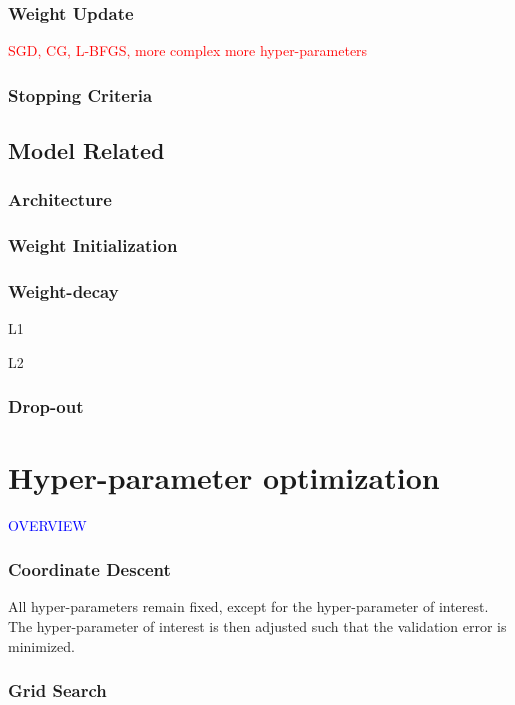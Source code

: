 \subsubsection{Weight Update}

\textcolor{red}{SGD, CG, L-BFGS, more complex more hyper-parameters}

\subsubsection{Stopping Criteria}

\subsection{Model Related}

\subsubsection{Architecture}

\subsubsection{Weight Initialization}

\subsubsection{Weight-decay}

L1

L2

\subsubsection{Drop-out}

\section{Hyper-parameter optimization}

\textcolor{blue}{OVERVIEW}

\subsubsection{Coordinate Descent}

All hyper-parameters remain fixed, except for the hyper-parameter of interest. The hyper-parameter of interest is then adjusted such that the validation error is minimized.

\subsubsection{Grid Search}


